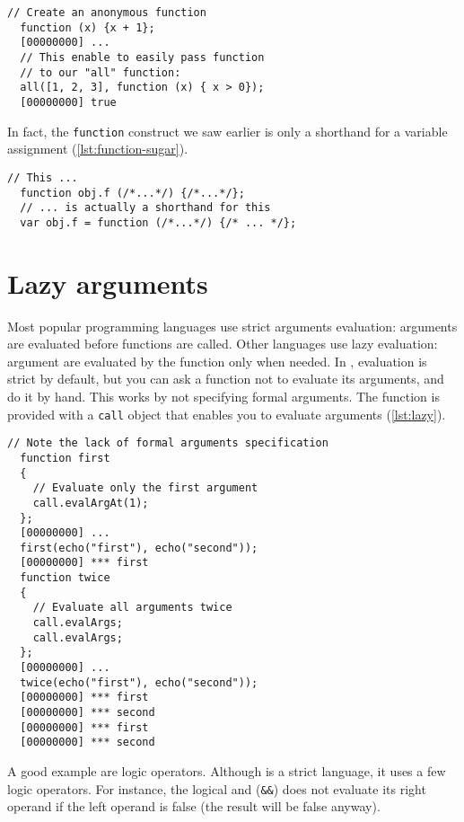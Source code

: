 \documentclass[openright,twoside,12pt]{report}
\begin{document}
\begin{lstlisting}[caption=Lambda function, label=lst:lambda]
  // Create an anonymous function
  function (x) {x + 1};
  [00000000] ...
  // This enable to easily pass function
  // to our "all" function:
  all([1, 2, 3], function (x) { x > 0});
  [00000000] true
\end{lstlisting}

In fact, the \texttt{function} construct we saw earlier is only a
shorthand for a variable assignment (\autoref{lst:function-sugar}).

\begin{lstlisting}[caption=The function sugar,
  label=lst:function-sugar]
  // This ...
  function obj.f (/*...*/) {/*...*/};
  // ... is actually a shorthand for this
  var obj.f = function (/*...*/) {/* ... */};
\end{lstlisting}

\section{Lazy arguments}

Most popular programming languages use strict arguments evaluation:
arguments are evaluated before functions are called. Other languages
use lazy evaluation: argument are evaluated by the function only when
needed. In \urbi, evaluation is strict by default, but you can ask a
function not to evaluate its arguments, and do it by hand. This works
by not specifying formal arguments. The function is provided with a
\texttt{call} object that enables you to evaluate arguments
(\autoref{lst:lazy}).

\begin{lstlisting}[caption=Tweaking arguments evaluation,
  label=lst:lazy]
  // Note the lack of formal arguments specification
  function first
  {
    // Evaluate only the first argument
    call.evalArgAt(1);
  };
  [00000000] ...
  first(echo("first"), echo("second"));
  [00000000] *** first
  function twice
  {
    // Evaluate all arguments twice
    call.evalArgs;
    call.evalArgs;
  };
  [00000000] ...
  twice(echo("first"), echo("second"));
  [00000000] *** first
  [00000000] *** second
  [00000000] *** first
  [00000000] *** second
\end{lstlisting}

A good example are logic operators. Although \Cxx is a strict
language, it uses a few logic operators. For instance, the logical and
(\texttt{\&\&}) does not evaluate its right operand if the left
operand is false (the result will be false anyway).
\end{document}
